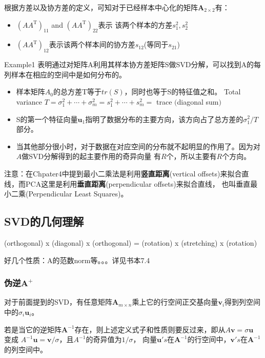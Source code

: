 根据方差以及协方差的定义，可知对于已经样本中心化的矩阵$\bm{A}_{2\times 2}$有：
\begin{itemize}
    \item $\left(A A^{\mathrm{T}}\right)_{11}$ and $\left(A A^{\mathrm{T}}\right)_{22}$表示
    该两个样本的方差$s_{1}^{2}, s_{2}^{2}$
    \item $\left(A A^{\mathrm{T}}\right)_{12}$表示该两个样本间的协方差$s_{12}$(等同于$s_{21}$)
\end{itemize}
Example1 表明通过对矩阵A利用其样本协方差矩阵S做SVD分解，可以找到A的每列样本在相应的空间中是如何分布的。
\begin{itemize}
    \item 样本矩阵$A_0$的总方差T等于$tr(S)$，同时也等于S的特征值之和。
    Total variance $T=\sigma_{1}^{2}+\cdots+\sigma_{m}^{2}=s_{1}^{2}+\cdots+s_{m}^{2}=$ trace $($diagonal sum$)$
    \item S的第一个特征向量$\bm{u}_1$指明了数据分布的主要方向，该方向占了总方差的$\sigma_{1}^{2} / T$部分。
    \item 当其他部分很小时，对于数据在对应空间的分布就不起明显的作用了。因为对$A$做SVD分解得到的起主要作用的奇异向量
    有$R$个，所以主要有$R$个方向。
\end{itemize}

注意：在Chpater4中提到最小二乘法是利用\textbf{竖直距离}(vertical offsets)来拟合直线，而PCA这里是利用\textbf{垂直距离}(perpendicular offsets)来拟合直线，
也叫垂直最小二乘(Perpendicular Least Squares)。

\subsection{SVD的几何理解}

(orthogonal) x (diagonal) x (orthogonal) = (rotation) x (stretching) x (rotation)

好几个性质：A的范数norm等。。。详见书本7.4

\subsubsection{伪逆$\mathbf{A}^+$}

对于前面提到的SVD，有任意矩阵$\bm{A}_{m\times n}$乘上它的行空间正交基向量$\bm{v}_i$得到列空间中的$\sigma_i \bm{u}_i$。

若是当它的逆矩阵$\bm{A}^{-1}$存在，则上述定义式子和性质则要反过来，即从$A \boldsymbol{v}=\sigma \boldsymbol{u}$ 变成
$A^{-1} \boldsymbol{u}=\boldsymbol{v} / \sigma$，且$A^{-1}$的奇异值为$1 / \sigma$，
向量$\bm{u}'s$在$\bm{A}^{-1}$的行空间中，$\bm{v}'s$在$\bm{A}^{-1}$的列空间中。

